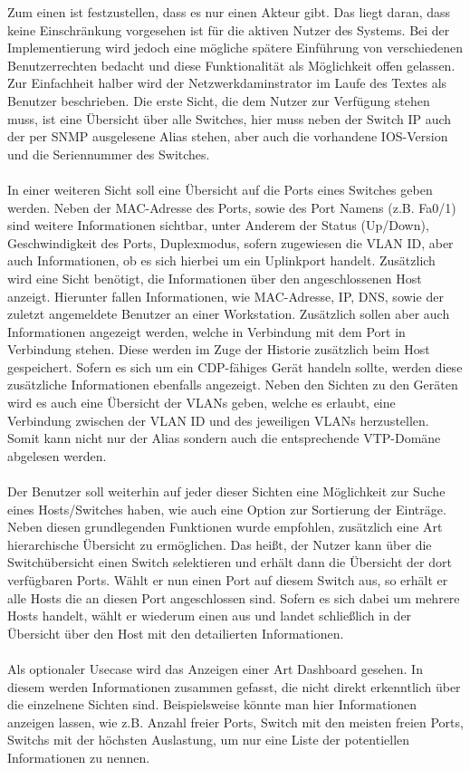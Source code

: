 Zum einen ist festzustellen, dass es nur einen Akteur gibt. Das liegt daran, dass keine Einschränkung vorgesehen ist für die aktiven Nutzer des Systems.
Bei der Implementierung wird jedoch eine mögliche spätere Einführung von verschiedenen Benutzerrechten bedacht und diese Funktionalität als Möglichkeit offen gelassen.
Zur Einfachheit halber wird der Netzwerkdaminstrator im Laufe des Textes als Benutzer beschrieben.
Die erste Sicht, die dem Nutzer zur Verfügung stehen muss, ist eine Übersicht über alle Switches, hier muss neben der Switch IP auch der per SNMP ausgelesene Alias stehen, aber auch die vorhandene IOS-Version und die Seriennummer des Switches.\\\\
In einer weiteren Sicht soll eine Übersicht auf die Ports eines Switches geben werden.
Neben der MAC-Adresse des Ports, sowie des Port Namens (z.B. Fa0/1) sind weitere Informationen sichtbar, unter Anderem der Status (Up/Down), Geschwindigkeit des Ports, Duplexmodus, sofern zugewiesen die VLAN ID, aber auch Informationen, ob es sich hierbei um ein Uplinkport handelt.
Zusätzlich wird eine Sicht benötigt, die Informationen über den angeschlossenen Host anzeigt.
Hierunter fallen Informationen, wie MAC-Adresse, IP, DNS, sowie der zuletzt angemeldete Benutzer an einer Workstation. Zusätzlich sollen aber auch Informationen angezeigt werden, welche in Verbindung mit dem Port in Verbindung stehen. Diese werden im Zuge der Historie zusätzlich beim Host gespeichert.
Sofern es sich um ein CDP-fähiges Gerät handeln sollte, werden diese zusätzliche Informationen ebenfalls angezeigt.
Neben den Sichten zu den Geräten wird es auch eine Übersicht der VLANs geben, welche es erlaubt, eine Verbindung zwischen der VLAN ID und des jeweiligen VLANs herzustellen.
Somit kann nicht nur der Alias sondern auch die entsprechende VTP-Domäne abgelesen werden.\\\\
Der Benutzer soll weiterhin auf jeder dieser Sichten eine Möglichkeit zur Suche eines Hosts/Switches haben, wie auch eine Option zur Sortierung der Einträge.
Neben diesen grundlegenden Funktionen wurde empfohlen, zusätzlich eine Art hierarchische Übersicht zu ermöglichen. Das heißt, der Nutzer kann über die Switchübersicht einen Switch selektieren und erhält dann die Übersicht der dort verfügbaren Ports. Wählt er nun einen Port auf diesem Switch aus, so erhält er alle Hosts die an diesen Port angeschlossen sind.
Sofern es sich dabei um mehrere Hosts handelt, wählt er wiederum einen aus und landet schließlich in der Übersicht über den Host mit den detailierten Informationen.\\\\
Als optionaler Usecase wird das Anzeigen einer Art Dashboard gesehen.
In diesem werden Informationen zusammen gefasst, die nicht direkt erkenntlich über die einzelnene Sichten sind. Beispielsweise könnte man hier Informationen anzeigen lassen, wie z.B. Anzahl freier Ports, Switch mit den meisten freien Ports, Switchs mit der höchsten Auslastung, um nur eine Liste der potentiellen Informationen zu nennen.

